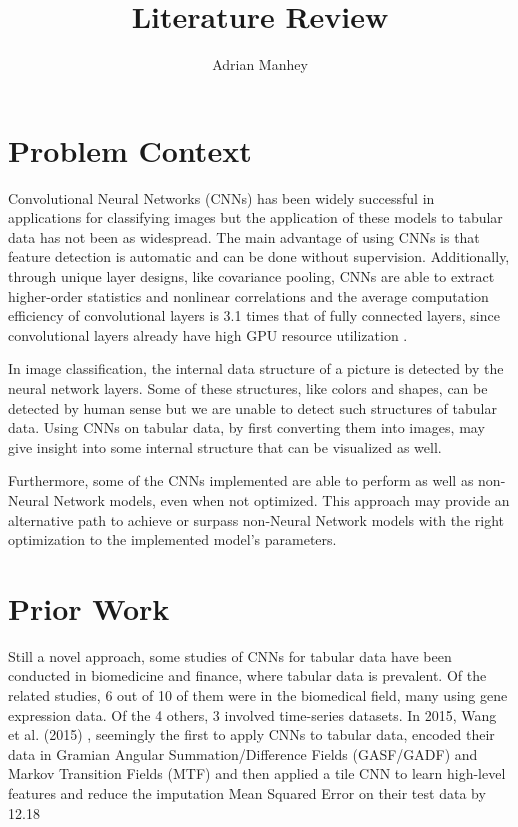 \documentclass[10pt,twocolumn]{article}
\title{Literature Review}
\author{Adrian Manhey}
\affiliation{Occidental College}
\begin{document}
\maketitle

\section{Problem Context}

Convolutional Neural Networks (CNNs) has been widely successful in applications for classifying images but the application of these models to tabular data has not been as widespread.
The main advantage of using CNNs is that feature detection is automatic and can be done without supervision.
Additionally, through unique layer designs, like covariance pooling, CNNs are able to extract higher-order statistics and nonlinear correlations \cite{Wang2019} and the average computation efficiency of convolutional layers is 3.1 times that of fully connected layers, since convolutional layers already have high GPU resource utilization \cite{Navamani2019}.

In image classification, the internal data structure of a picture is detected by the neural network layers. Some of these structures, like colors and shapes, can be detected by human sense but we are unable to detect such structures of tabular data. Using CNNs on tabular data, by first converting them into images, may give insight into some internal structure that can be visualized as well.

Furthermore, some of the CNNs implemented are able to perform as well as non-Neural Network models, even when not optimized.
This approach may provide an alternative path to achieve or surpass non-Neural Network models with the right optimization to the implemented model’s parameters.

\section{Prior Work}

Still a novel approach, some studies of CNNs for tabular data have been conducted in biomedicine and finance, where tabular data is prevalent.
Of the related studies, 6 out of 10 of them were in the biomedical field, many using gene expression data. Of the 4 others, 3 involved time-series datasets. In 2015, Wang et al. (2015) \cite{Wang2015}, seemingly the first to apply CNNs to tabular data, encoded their data in Gramian Angular Summation/Difference Fields (GASF/GADF) and Markov Transition Fields (MTF) and then applied a tile CNN to learn high-level features and reduce the imputation Mean Squared Error on their test data by 12.18%
\end{document}
